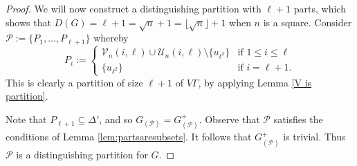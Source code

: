 \documentclass[10pt,a4paper]{amsart}
\begin{document}
\begin{proof}

We will now construct a distinguishing partition with \(\ell+1\) parts, which shows that \(D(G)=\ell+1=\sqrt{n}+1=\lfloor \sqrt{n}\rfloor +1\) when \(n\) is a square.
Consider \(\mathcal{P}:=\{P_{1},\ldots, P_{\ell+1}\}\)  whereby 
\begin{equation}
P_{i}:=
\begin{cases}
    \mathcal{V}_n(i,\ell)\cup\mathcal{U}_n(i,\ell) \setminus \{u_{\ell^{2}}\} & \text{if } 1\leqslant i\leqslant \ell\\
    \{u_{\ell^{2}}\} & \text{if } i=\ell+1.
\end{cases}
\end{equation}
This is clearly a partition of size $\ell+1$ of \(V\Gamma\),
by applying Lemma \ref{V is partition}.


%


Note that  \(P_{\ell+1}\subseteq \Delta'\),
and so $G_{(\mathcal{P})}=G^+_{(\mathcal{P})}$. 
Observe that \(\mathcal{P}\) satisfies the conditions of Lemma \ref{lem:partsaresubsets}. It follows that $G^+_{(\mathcal{P})}$ is trivial.
Thus $\mathcal{P}$ is a distinguishing partition for $G$.
\end{proof}
\end{document}
